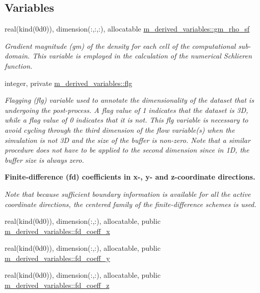 \subsection*{Variables}
\begin{DoxyCompactItemize}
\item 
real(kind(0d0)), dimension(\+:,\+:,\+:), allocatable \hyperlink{namespacem__derived__variables_a102e235b77ff78573a043c5c9b9bb0d8}{m\+\_\+derived\+\_\+variables\+::gm\+\_\+rho\+\_\+sf}
\begin{DoxyCompactList}\small\item\em Gradient magnitude (gm) of the density for each cell of the computational sub-\/domain. This variable is employed in the calculation of the numerical Schlieren function. \end{DoxyCompactList}\item 
integer, private \hyperlink{namespacem__derived__variables_a2a27e1fa08c6751186a38d562b826955}{m\+\_\+derived\+\_\+variables\+::flg}
\begin{DoxyCompactList}\small\item\em Flagging (flg) variable used to annotate the dimensionality of the dataset that is undergoing the post-\/process. A flag value of 1 indicates that the dataset is 3D, while a flag value of 0 indicates that it is not. This flg variable is necessary to avoid cycling through the third dimension of the flow variable(s) when the simulation is not 3D and the size of the buffer is non-\/zero. Note that a similar procedure does not have to be applied to the second dimension since in 1D, the buffer size is always zero. \end{DoxyCompactList}\end{DoxyCompactItemize}
\begin{Indent}\textbf{ Finite-\/difference (fd) coefficients in x-\/, y-\/ and z-\/coordinate directions.}\par
{\em Note that because sufficient boundary information is available for all the active coordinate directions, the centered family of the finite-\/difference schemes is used. }\begin{DoxyCompactItemize}
\item 
real(kind(0d0)), dimension(\+:,\+:), allocatable, public \hyperlink{namespacem__derived__variables_a4f61d6bef7f53e49a0f5e4a3f9577912}{m\+\_\+derived\+\_\+variables\+::fd\+\_\+coeff\+\_\+x}
\item 
real(kind(0d0)), dimension(\+:,\+:), allocatable, public \hyperlink{namespacem__derived__variables_ab273055cd131e3ce73c1f468b78af7b7}{m\+\_\+derived\+\_\+variables\+::fd\+\_\+coeff\+\_\+y}
\item 
real(kind(0d0)), dimension(\+:,\+:), allocatable, public \hyperlink{namespacem__derived__variables_a3cafc9204d5773653e119ce3a3b98722}{m\+\_\+derived\+\_\+variables\+::fd\+\_\+coeff\+\_\+z}
\end{DoxyCompactItemize}
\end{Indent}


